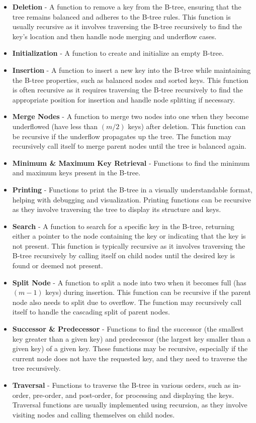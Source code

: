 \begin{itemize}
    \item \textbf{Deletion} - A function to remove a key from the B-tree, ensuring that the tree remains balanced and adheres to the B-tree rules. This function is usually recursive as it involves traversing 
    the B-tree recursively to find the key's location and then handle node merging and underflow cases.
    \item \textbf{Initialization} - A function to create and initialize an empty B-tree.
    \item \textbf{Insertion} - A function to insert a new key into the B-tree while maintaining the B-tree properties, such as balanced nodes and sorted keys. This function is often recursive as it 
    requires traversing the B-tree recursively to find the appropriate position for insertion and handle node splitting if necessary.
    \item \textbf{Merge Nodes} - A function to merge two nodes into one when they become underflowed (have less than $(m/2)$ keys) after deletion. This function can be recursive if the underflow propagates up 
    the tree. The function may recursively call itself to merge parent nodes until the tree is balanced again.
    \item \textbf{Minimum \& Maximum Key Retrieval} - Functions to find the minimum and maximum keys present in the B-tree.
    \item \textbf{Printing} - Functions to print the B-tree in a visually understandable format, helping with debugging and visualization. Printing functions can be recursive as they involve traversing the 
    tree to display its structure and keys.
    \item \textbf{Search} - A function to search for a specific key in the B-tree, returning either a pointer to the node containing the key or indicating that the key is not present. This function is 
    typically recursive as it involves traversing the B-tree recursively by calling itself on child nodes until the desired key is found or deemed not present.
    \item \textbf{Split Node} - A function to split a node into two when it becomes full (has $(m-1)$ keys) during insertion. This function can be recursive if the parent node also needs to split due to 
    overflow. The function may recursively call itself to handle the cascading split of parent nodes.
    \item \textbf{Successor \& Predecessor} - Functions to find the successor (the smallest key greater than a given key) and predecessor (the largest key smaller than a given key) of a given key. These 
    functions may be recursive, especially if the current node does not have the requested key, and they need to traverse the tree recursively.
    \item \textbf{Traversal} - Functions to traverse the B-tree in various orders, such as in-order, pre-order, and post-order, for processing and displaying the keys. Traversal functions are usually 
    implemented using recursion, as they involve visiting nodes and calling themselves on child nodes.
\end{itemize}

